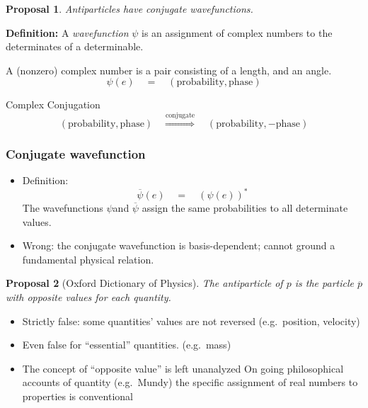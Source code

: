 \documentclass{beamer}
\def\ol{\overline}
\newtheorem{prop}{Proposal}
\begin{document}
\begin{frame}
  \begin{prop} Antiparticles have conjugate wavefunctions. \end{prop}
  \bigskip \pause


  \textbf{Definition:} A \emph{wavefunction} $\psi$ is an assignment
  of complex numbers to the determinates of a determinable.

  \bigskip A (nonzero) complex number is a pair consisting of a
  length, and an angle.
$$ \psi (e) \quad = \quad (\text{probability},\text{phase}) $$

\bigskip Complex Conjugation
$$(\text{probability},\text{phase}) \quad
\stackrel{\text{conjugate}}{\Longrightarrow} \quad
(\text{probability},-\text{phase})$$

\end{frame}

\begin{frame}
\frametitle{Conjugate wavefunction}

\begin{itemize}
\item Definition:
$$\overline{\psi}(e) \quad =\quad (\psi (e))^* $$
The wavefunctions $\psi$and $\ol\psi$ assign the same probabilities to
all determinate values. \pause
\item Wrong: the conjugate wavefunction is basis-dependent; cannot
  ground a fundamental physical relation.
\end{itemize}

\end{frame}


\begin{frame}
  \begin{prop}[Oxford Dictionary of Physics] The antiparticle of $p$
    is the particle $\ol p$ with \emph{opposite} values for each
    quantity. \end{prop}


\bigskip \pause
\begin{itemize}
\item Strictly false: some quantities' values are not reversed (e.g.\
  position, velocity) \pause
\item Even false for ``essential'' quantities.  (e.g.\ mass) \pause
\item The concept of ``opposite value'' is left unanalyzed \newline On
  going philosophical accounts of quantity (e.g.\ Mundy) the specific
  assignment of real numbers to properties is conventional
\end{itemize}
\end{frame}
\end{document}

